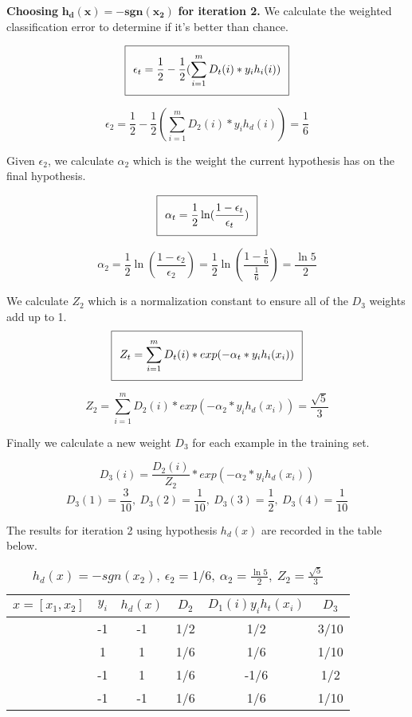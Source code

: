 \documentclass[11pt]{article}
\begin{document}
\textbf{Choosing} $\mathbf{h_d(x) = -sgn(x_2)}$ \textbf{for iteration 2.} We calculate the weighted classification error to determine if it's better than chance.

\begin{equation}
\setlength\fboxsep{0.25cm}
\setlength\fboxrule{0.4pt}
\boxed{\epsilon_t = \frac{1}{2} - \frac{1}{2}(\sum_{i=1}^m D_t(i)*y_ih_i(i))}
\end{equation}

$$\epsilon_2 = \frac{1}{2} - \frac{1}{2}(\sum_{i=1}^m D_2(i)*y_ih_d(i)) = \frac{1}{6}$$

Given $\epsilon_2$, we calculate $\alpha_2$ which is the weight the current hypothesis has on the final hypothesis.

\begin{equation}
\setlength\fboxsep{0.25cm}
\setlength\fboxrule{0.4pt}
\boxed{\alpha_t = \frac{1}{2}\ln(\frac{1 - \epsilon_t}{\epsilon_t})}
\end{equation}

$$\alpha_2 = \frac{1}{2}\ln(\frac{1 - \epsilon_2}{\epsilon_2}) = \frac{1}{2}\ln(\frac{1 - \frac{1}{6}}{\frac{1}{6}}) = \frac{\ln5}{2}$$

We calculate $Z_2$ which is a normalization constant to ensure all of the $D_3$ weights add up to 1.
\begin{equation}
\setlength\fboxsep{0.25cm}
\setlength\fboxrule{0.4pt}
\boxed{Z_t = \sum_{i = 1}^m D_t(i) * exp(-\alpha_t * y_ih_i(x_i))}
\end{equation}

$$Z_2 = \sum_{i = 1}^m D_2(i) * exp(-\alpha_2 * y_ih_d(x_i)) = \frac{\sqrt{5}}{3}$$

Finally we calculate a new weight $D_3$ for each example in the training set.

$$D_{3}(i) = \frac{D_2(i)}{Z_2} * exp(-\alpha_2 * y_ih_d(x_i))$$
$$D_3(1) = \frac{3}{10}, \ D_3(2) = \frac{1}{10}, \ D_3(3) = \frac{1}{2}, \ D_3(4) = \frac{1}{10} $$

The results for iteration 2 using hypothesis $h_d(x)$ are recorded in the table below.

\begin{table}[H]
\centering
{\renewcommand{\arraystretch}{1.2}%
\begin{tabular}{| c | c | c | c | c | c |}
\hline
$x = [x_1, x_2]$& $y_i$ & $h_d(x)$ & $D_2$ & $D_1(i)y_ih_t(x_i)$ & $D_3$\\
\hline
[1,1] & -1 & -1 & 1/2 &  1/2& 3/10\\ \hline
[1,-1] & 1 &  1&  1/6&  1/6& 1/10\\ \hline
[-1,-1] & -1 & 1 & 1/6&  -1/6& 1/2\\ \hline
[-1,1] & -1 & -1 &  1/6&  1/6& 1/10\\ \hline
\end{tabular}}
\caption{$h_d(x) = -sgn(x_2), \ \epsilon_2 = 1/6, \ \alpha_2 = \frac{\ln5}{2}, \ Z_2 = \frac{\sqrt{5}}{3}$}
\end{table}
\end{document}
